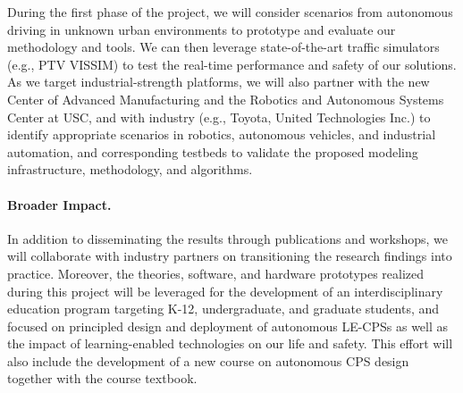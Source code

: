 \documentclass[10pt]{dod-blank}
\begin{document}
During the first phase of the project, we will consider scenarios from autonomous driving in unknown urban environments to prototype and evaluate our methodology and tools. We can then leverage state-of-the-art traffic simulators (e.g., PTV VISSIM) to 
test the real-time performance and safety of our solutions. 
As we target industrial-strength platforms, we will also partner with the new Center of Advanced Manufacturing and the Robotics and Autonomous Systems Center at USC, and with industry (e.g., Toyota, United Technologies Inc.) to identify appropriate scenarios in robotics, autonomous vehicles, and industrial automation, and corresponding testbeds to validate the proposed modeling infrastructure, methodology, and algorithms.  

\paragraph{Broader Impact.} In addition to disseminating the results through publications and workshops, we will collaborate with industry partners on transitioning the research findings into practice. Moreover, the theories, software, and hardware prototypes realized during this project will be leveraged for the development of an interdisciplinary education program targeting K-12, undergraduate, and graduate students, and focused on principled design and deployment of autonomous LE-CPSs as well as the impact of learning-enabled technologies on our life and safety. This effort will also include the development of a new course on autonomous CPS design together with the course textbook. 

{\scriptsize
 

}
\end{document}

